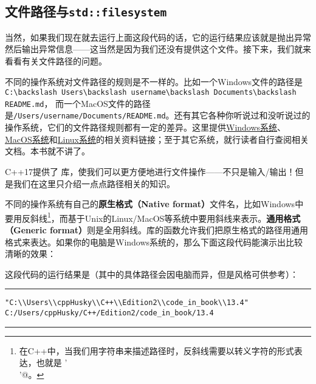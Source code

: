 \subsection*{文件路径与\texttt{std::filesystem}}
当然，如果我们现在就去运行上面这段代码的话，它的运行结果应该就是抛出异常然后输出异常信息——这当然是因为我们还没有提供这个文件。接下来，我们就来看看有关文件路径的问题。\par
不同的操作系统对文件路径的规则是不一样的。比如一个Windows文件的路径是\verb|C:\backslash Users\backslash username\backslash Documents\backslash README.md|，
而一个MacOS文件的路径是\verb|/Users/username/Documents/README.md|。还有其它各种你听说过和没听说过的操作系统，它们的文件路径规则都有一定的差异。这里提供\href{https://learn.microsoft.com/zh-cn/windows/win32/fileio/naming-a-file}{Windows系统}、\href{https://developer.apple.com/library/archive/documentation/FileManagement/Conceptual/FileSystemProgrammingGuide/FileSystemOverview/FileSystemOverview.html#//apple_ref/doc/uid/TP40010672-CH2-SW14}{MacOS系统}和\href{https://www.pathname.com/fhs/}{Linux系统}的相关资料链接；至于其它系统，就行读者自行查阅相关文档。本书就不讲了。\par
C++17提供了 \lstinline@filesystem@ 库，使我们可以更方便地进行文件操作——不只是输入/输出！但是我们在这里只介绍一点点路径相关的知识。\par
不同的操作系统有自己的\textbf{原生格式（Native format）}文件名，比如Windows中要用反斜线\footnote{在C++中，当我们用字符串来描述路径时，反斜线需要以转义字符的形式表达，也就是 \lstinline@'\\'@。}，而基于Unix的Linux/MacOS等系统中要用斜线来表示。\textbf{通用格式（Generic format）}则是全用斜线。\lstinline@filesystem@ 库的函数允许我们把原生格式的路径用通用格式来表达。如果你的电脑是Windows系统的，那么下面这段代码能演示出比较清晰的效果：

这段代码的运行结果是（其中的具体路径会因电脑而异，但是风格可供参考）：\\\noindent\rule{\linewidth}{.2pt}
\begin{verbatim}
"C:\\Users\\cppHusky\\C++\\Edition2\\code_in_book\\13.4"
C:/Users/cppHusky/C++/Edition2/code_in_book/13.4
\end{verbatim}\noindent\rule{\linewidth}{.2pt}\par
